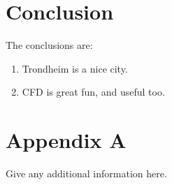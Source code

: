 \documentclass{CFD2017}
\begin{document}
\section{Conclusion}
The conclusions are:
\begin{enumerate}
  \item Trondheim is a nice city.
  \item CFD is great fun, and useful too.
\end{enumerate}






\newpage
\section{Appendix A}
Give any additional information here.
\end{document}
